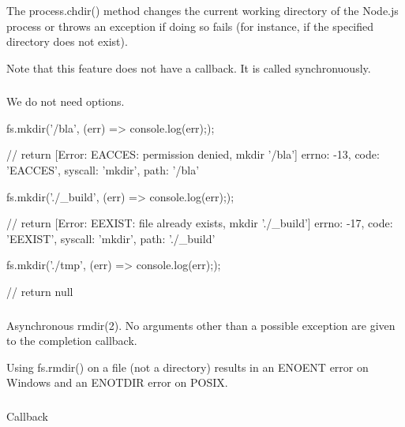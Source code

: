 The process.chdir() method changes the current working directory of the
Node.js process or throws an exception if doing so fails (for instance, if the
specified directory does not exist).

Note that this feature does not have a callback. It is called synchronuously.

\subsubsection{}

We do not need options.

\begin{js}
  fs.mkdir('/bla', (err) => {console.log(err);});

  // return
  { [Error: EACCES: permission denied, mkdir '/bla']
    errno: -13,
    code: 'EACCES',
    syscall: 'mkdir',
    path: '/bla' }
\end{js}


\begin{js}
  fs.mkdir('./_build', (err) => {console.log(err);});

  // return
  { [Error: EEXIST: file already exists, mkdir './_build']
    errno: -17,
    code: 'EEXIST',
    syscall: 'mkdir',
    path: './_build' }
\end{js}

\begin{js}
  fs.mkdir('./tmp', (err) => {console.log(err);});

  // return
  null
\end{js}




\subsubsection{}

Asynchronous rmdir(2). No arguments other than a possible exception are given
to the completion callback.

Using fs.rmdir() on a file (not a directory) results in an ENOENT error on
Windows and an ENOTDIR error on POSIX.



\subsubsection{}

Callback 

